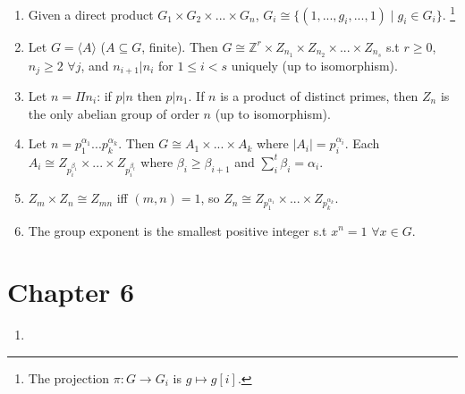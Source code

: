 \documentclass{article}
\begin{document}
\begin{enumerate}[1.]
    \item Given a direct product $G_1 \times G_2 \times ... \times G_n$,
        $G_i \cong \{(1, ..., g_i, ..., 1) \mid g_i \in G_i\}$.
        \footnote{The projection $\pi : G \rightarrow G_i$ is $g \mapsto
        g[i]$.}
    \item Let $G = \langle A \rangle$ ($A \subseteq G$, finite). Then $G \cong
        \mathbb{Z}^r \times Z_{n_1} \times Z_{n_2} \times ... \times
        Z_{n_s}$ s.t $r \geq 0$, $n_j \geq 2$ $\forall j$, and $n_{i+1} |
        n_i$ for $1 \leq i < s$ uniquely (up to isomorphism).
    \item Let $n = \Pi n_i$: if $p | n$ then $p | n_1$. If $n$ is a product
        of distinct primes, then $Z_n$ is the only abelian group of order
        $n$ (up to isomorphism).
    \item Let $n = p_1^{\alpha_1}...p_k^{\alpha_k}$. Then $G \cong A_1
        \times ... \times A_k$ where $|A_i| = p_i^{\alpha_i}$. Each $A_i
        \cong Z_{p_i^{\beta_1}} \times ... \times Z_{p_i^{\beta_t}}$ where
        $\beta_i \geq \beta_{i+1}$ and $\sum_i^t \beta_i = \alpha_i$.
    \item $Z_m \times Z_n \cong Z_{mn}$ iff $(m, n) = 1$, so $Z_n \cong
        Z_{p_1^{\alpha_1}} \times ... \times Z_{p_k^{\alpha_k}}$.
    \item The group exponent is the smallest positive integer s.t $x^n = 1$
        $\forall x \in G$.
\end{enumerate}

\section*{Chapter 6}

\begin{enumerate}[1.]
    \item 
\end{enumerate}
\end{document}

